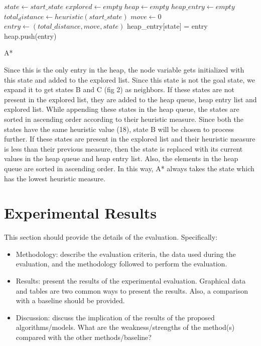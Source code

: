 \documentclass{svproc}
\begin{document}
\setlength{\intextsep}{5pt}
\begin{algorithm}
	\SetAlgoLined
	$state \gets start\_state$\;
	$explored \gets empty$\;
	$heap \gets empty$\;
	$heap\_entry \gets empty$\;
	$total_distance \gets heuristic(start\_state)$\;
	$move \gets 0$\;
	$entry \gets (total\_distance, move, state)$\;
	heap\_entry[state] = entry\;
	heap.push(entry)\;
	\caption{A*}
\end{algorithm}
\noindent Since this is the only entry in the heap, the node variable gets initialized with this state and added to the explored list. Since this state is not the goal state, we expand it to get states B and C (fig 2) as neighbors. If these states are not present in the explored list, they are added to the heap queue, heap entry list and explored list. While appending these states in the heap queue, the states are sorted in ascending order according to their heuristic measure. Since both the states have the same heuristic value (18), state B will be chosen to process further. If these states are present in the explored list and their heuristic measure is less than their previous measure, then the state is replaced with its current values in the heap queue and heap entry list. Also, the elements in the heap queue are sorted in ascending order. In this way, A* always takes the state which has the lowest heuristic measure. 

\section{Experimental Results}
This section should provide the details of the evaluation. Specifically:
\begin{itemize}
\item Methodology: describe the evaluation criteria, the data used during the evaluation, and the methodology followed to perform the evaluation. 
\item Results: present the results of the experimental evaluation. Graphical data and tables are two common ways to present the results. Also, a comparison with a baseline should be provided.
\item Discussion: discuss the implication of the results of the proposed algorithms/models. What are the weakness/strengths of the method(s) compared with the other methods/baseline?
\end{itemize}
\end{document}

